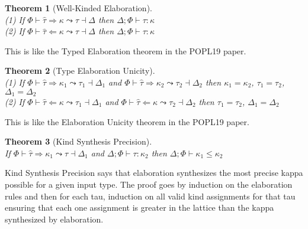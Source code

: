 \documentclass[12pt,letterpaper]{article}
\newcommand{\elabAna}[5]{#1 \vdash #2 \Leftarrow #3 \leadsto #4 \dashv #5}
\newcommand{\elabSyn}[5]{#1 \vdash #2 \Rightarrow #3 \leadsto #4 \dashv #5}
\newcommand{\kindAssign}[3]{#1 \vdash #2 : #3}
\newcommand{\kindLeqLattice}[3]{#1 \vdash #2 \leq #3}
\newcommand{\hPhi}{\Phi}
\newcommand{\htau}{\hat{\tau}}
\newcommand{\hkappa}{\kappa}
\newcommand{\dtau}{\tau}
\begin{document}
\newtheorem{thm}{Theorem}
\begin{thm}[Well-Kinded Elaboration]\ \\
	(1) If $\elabSyn{\hPhi}{\htau}{\hkappa}{\dtau}{\Delta}$ then $\kindAssign{\Delta;\hPhi}{\dtau}{\hkappa}$ \\
	(2) If $\elabAna{\hPhi}{\htau}{\hkappa}{\dtau}{\Delta}$ then $\kindAssign{\Delta;\hPhi}{\dtau}{\hkappa}$
\end{thm}
\noindent
This is like the Typed Elaboration theorem in the POPL19 paper.

\begin{thm}[Type Elaboration Unicity]\ \\
	(1) If $\elabSyn{\hPhi}{\htau}{\hkappa_1}{\dtau_1}{\Delta_1}$ and $\elabSyn{\hPhi}{\htau}{\hkappa_2}{\dtau_2}{\Delta_2}$ then $\hkappa_1 = \hkappa_2$, $\dtau_1 = \dtau_2$, $\Delta_1 = \Delta_2$ \\
	(2) If $\elabAna{\hPhi}{\htau}{\hkappa}{\dtau_1}{\Delta_1}$ and $\elabAna{\hPhi}{\htau}{\hkappa}{\dtau_2}{\Delta_2}$ then $\dtau_1 = \dtau_2$, $\Delta_1 = \Delta_2$
\end{thm}
\noindent
This is like the Elaboration Unicity theorem in the POPL19 paper.


\begin{thm}[Kind Synthesis Precision]\ \\
	If $\elabSyn{\hPhi}{\htau}{\hkappa_1}{\dtau}{\Delta_1}$ and $\kindAssign{\Delta;\hPhi}{\dtau}{\hkappa_2}$ then $\kindLeqLattice{\Delta;\hPhi}{\hkappa_1}{\hkappa_2}$
\end{thm}

\noindent
Kind Synthesis Precision says that elaboration synthesizes the most precise kappa possible for a given input type. The proof goes by induction on the elaboration rules and then for each tau, induction on all valid kind assignments for that tau ensuring that each one assignment is greater in the lattice than the kappa synthesized by elaboration.
\end{document}
